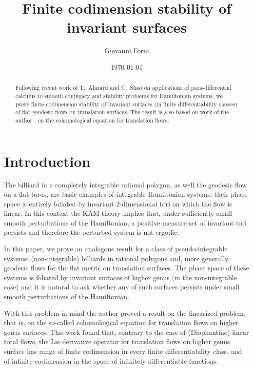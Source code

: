\documentclass[11pt]{amsart}
\title[Finite codimension stability of invariant surfaces]%
{Finite codimension stability of invariant surfaces}
\author{Giovanni Forni}
\date{\today}
\begin{document}
\def\echo#1{\relax}
    
\begin{abstract}
Following recent work of T.~Alazard and C.~Shao \cite{AlSh} on applications of para-differential calculus  to smooth conjugacy and stability problems for Hamiltonian systems, we  prove finite codimension stability  of invariant surfaces (in finite differentiability classes) of flat geodesic flows on translation surfaces.  
The result is also based  on work of the author \cite{F97},
\cite{F21} on the cohomological equation for translation flows.
\begin{sloppypar}
  \end{sloppypar}
\end{abstract}
\maketitle
\section{Introduction}

The billiard in a completely integrable rational polygon, as well the geodesic flow on a flat torus, are basic examples of integrable Hamiltonian
systems: their phase space is entirely foliated by invariant $2$-dimensional tori on which the flow is linear. In this context the KAM theory 
implies that, under sufficiently small smooth perturbations of the Hamiltonian, a positive measure set of invariant tori persists and therefore the
perturbed system is not ergodic. 

\smallskip
In this paper, we prove an analogous result for a class of pseudo-integrable systems: (non-integrable) billiards in rational polygons and, more generally,
geodesic flows for the flat metric on translation surfaces. The phase space of these systems is foliated by invariant surfaces of higher genus (in the
non-integrable case) and it is natural to ask whether any of such surfaces persists under small smooth perturbations of the Hamiltonian.

\smallskip
With this problem in mind the author proved a result \cite{F97} on the linearized problem, that is, on the so-called cohomological equation for translation flows
on higher genus surfaces. This work found that, contrary to the case of (Diophantine) linear toral flows, the Lie derivative operator for translation flows
on higher genus surface has range of finite codimension in every finite differentiability class, and of infinite codimension in the space of infinitely differentiable
functions. 
\end{document}
